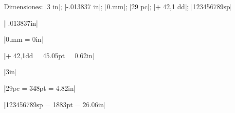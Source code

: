

\bigskip


\noindent Dimensiones: |3 in|; |-.013837 in|; |0.mm|; |29 pc|; |+ 42,1
dd|; |123456789sp|

\bigskip

\respuesta{}

\medskip
|-.013837in|

|0.mm = 0in|

|+ 42,1dd = 45.05pt = 0.62in|

|3in|

|29pc = 348pt = 4.82in|

|123456789sp = 1883pt = 26.06in|

\bye

